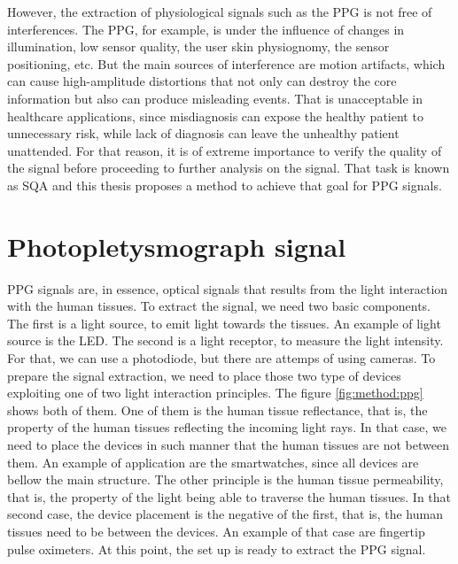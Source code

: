 However, the extraction of physiological signals such as the \gls{PPG} is not free of interferences. The \gls{PPG}, for example, is under the influence of changes in illumination, low sensor quality, the user skin physiognomy, the sensor positioning, etc. But the main sources of interference are motion artifacts, which can cause high-amplitude distortions that not only can destroy the core information but also can produce misleading events. That is unacceptable in healthcare applications, since misdiagnosis can expose the healthy patient to unnecessary risk, while lack of diagnosis can leave the unhealthy patient unattended. For that reason, it is of extreme importance to verify the quality of the signal before proceeding to further analysis on the signal. That task is known as \gls{SQA} and this thesis proposes a method to achieve that goal for \gls{PPG} signals.    

\section{Photopletysmograph signal}

\gls{PPG} signals are, in essence, optical signals that results from the light interaction with the human tissues. To extract the signal, we need two basic components. The first is a light source, to emit light towards the tissues. An example of light source is the \gls{LED}. The second is a light receptor, to measure the light intensity. For that, we can use a photodiode, but there are attemps of using cameras. To prepare the signal extraction, we need to place those two type of devices exploiting one of two light interaction principles. The figure \ref{fig:method:ppg} shows both of them. One of them is the human tissue reflectance, that is, the property of the human tissues reflecting the incoming light rays. In that case, we need to place the devices in such manner that the human tissues are not between them. An example of application are the smartwatches, since all devices are bellow the main structure.  The other principle is the human tissue permeability, that is, the property of the light being able to traverse the human tissues. In that second case, the device placement is the negative of the first, that is, the human tissues need to be between the devices. An example of that case are fingertip pulse oximeters. At this point, the set up is ready to extract the \gls{PPG} signal.



